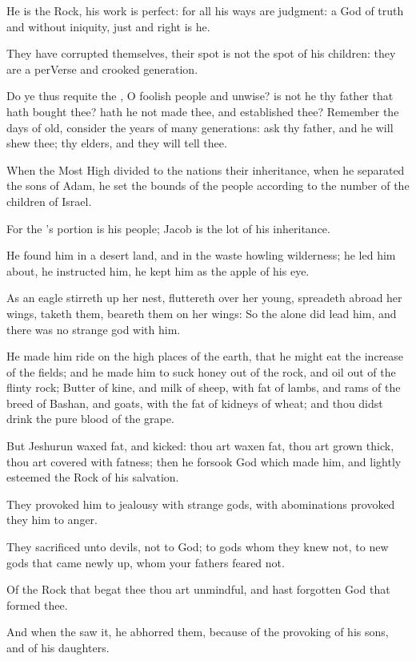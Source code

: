 \Verse He is the Rock, his work is perfect: for all his ways are judgment: a God of truth and without iniquity, just and right is he.

\Verse They have corrupted themselves, their spot is not the spot of his children: they are a perVerse and crooked generation.

\Verse Do ye thus requite the \LORD, O foolish people and unwise? is not he thy father that hath bought thee? hath he not made thee, and established thee?  \Verse Remember the days of old, consider the years of many generations: ask thy father, and he will shew thee; thy elders, and they will tell thee.

\Verse When the Most High divided to the nations their inheritance, when he separated the sons of Adam, he set the bounds of the people according to the number of the children of Israel.

\Verse For the \LORD's portion is his people; Jacob is the lot of his inheritance.

\Verse He found him in a desert land, and in the waste howling wilderness; he led him about, he instructed him, he kept him as the apple of his eye.

\Verse As an eagle stirreth up her nest, fluttereth over her young, spreadeth abroad her wings, taketh them, beareth them on her wings: \Verse So the \LORD alone did lead him, and there was no strange god with him.

\Verse He made him ride on the high places of the earth, that he might eat the increase of the fields; and he made him to suck honey out of the rock, and oil out of the flinty rock; \Verse Butter of kine, and milk of sheep, with fat of lambs, and rams of the breed of Bashan, and goats, with the fat of kidneys of wheat; and thou didst drink the pure blood of the grape.

\Verse But Jeshurun waxed fat, and kicked: thou art waxen fat, thou art grown thick, thou art covered with fatness; then he forsook God which made him, and lightly esteemed the Rock of his salvation.

\Verse They provoked him to jealousy with strange gods, with abominations provoked they him to anger.

\Verse They sacrificed unto devils, not to God; to gods whom they knew not, to new gods that came newly up, whom your fathers feared not.

\Verse Of the Rock that begat thee thou art unmindful, and hast forgotten God that formed thee.

\Verse And when the \LORD saw it, he abhorred them, because of the provoking of his sons, and of his daughters.

